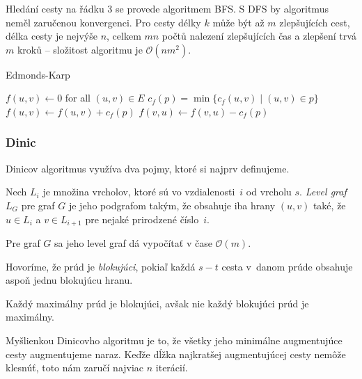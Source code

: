 Hledání cesty na řádku 3 se provede algoritmem BFS. S DFS by algoritmus
neměl zaručenou konvergenci. Pro cesty délky $k$
může být až $m$ zlepšujících cest, délka cesty je nejvýše
$n$, celkem $mn$
počtů nalezení zlepšujících čas a zlepšení trvá $m$
kroků -- složitost algoritmu je
$\mathcal{O}(nm^2)$.

\begin{algorithm}[H]
\caption{Edmonds-Karp}
\begin{algorithmic}[1]
    \State $f(u,v) \gets 0$ for all $(u,v) \in E$
        \State $c_f(p) = \min \{ c_f(u,v) \mid (u,v) \in p \}$
            \State $f(u,v) \gets f(u,v) + c_f(p)$
            \State $f(v,u) \gets f(v,u) - c_f(p)$
        \EndFor
    \EndWhile
\EndFunction
\end{algorithmic}
\end{algorithm}

\subsubsection*{Dinic}
Dinicov algoritmus využíva dva pojmy, ktoré si najprv definujeme.

\begin{definition}
Nech $L_i$ je množina vrcholov, ktoré sú vo vzdialenosti~$i$ od
vrcholu $s$. {\em Level graf} $L_G$ pre graf $G$ je jeho podgrafom
takým, že obsahuje iba hrany $(u,v)$ také, že $u \in L_i$ a 
$v \in L_{i+1}$ pre nejaké prirodzené číslo~$i$.
\end{definition}

Pre graf $G$ sa jeho level graf dá vypočítať v čase $\mathcal{O}(m)$.

\begin{definition}
Hovoríme, že prúd je {\em blokujúci}, pokiaľ každá $s-t$ cesta v~danom
prúde obsahuje aspoň jednu blokujúcu hranu. 
\end{definition}

\begin{lemma}
	Každý maximálny prúd je blokujúci, avšak nie každý blokujúci prúd
	je maximálny.
\end{lemma}

Myšlienkou Dinicovho algoritmu je to, že všetky jeho minimálne augmentujúce
cesty augmentujeme naraz. Keďže dĺžka najkratšej augmentujúcej cesty
nemôže klesnúť, toto nám zaručí najviac $n$ iterácií.

